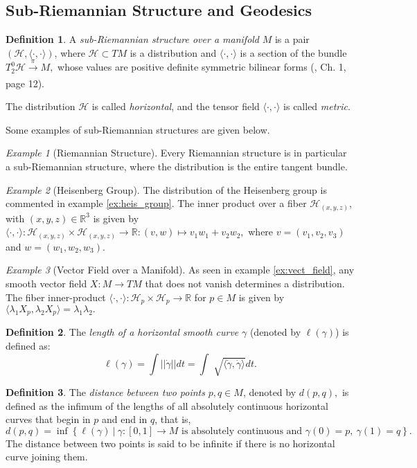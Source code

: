 \documentclass[12pt, letterpaper, reqno]{amsart}
\theoremstyle{definition}
\newtheorem{df}{Definition}
\theoremstyle{plain}
\theoremstyle{remark}
\newtheorem{ex}{Example}
\begin{document}
\subsection{Sub-Riemannian Structure and Geodesics}%
\label{sub:sub-Riemannian_structure_and_geodesics}
\begin{df}
	A \textit{sub-Riemannian structure over a manifold} $ M $ is a pair $ (\mathcal{H}, \langle\cdot,\cdot\rangle)$, where $ \mathcal{H}\subset TM $ is a distribution and $ \langle\cdot,\cdot\rangle $ is a section of the bundle $ T^0_2 \mathcal{H} \xrightarrow[]{\pi} M, $ whose values are positive definite symmetric bilinear forms (\cite{hatcher2003vector}, Ch. 1, page 12).

	The distribution $ \mathcal{H} $ is called \textit{horizontal}, and the tensor field $ \langle\cdot,\cdot\rangle $ is called \textit{metric}.  
\end{df}

Some examples of sub-Riemannian structures are given below.
\begin{ex}[Riemannian Structure]\label{ex:riem_geo2}
	Every Riemannian structure is in particular a sub-Riemannian structure, where the distribution is the entire tangent bundle.
\end{ex}

\begin{ex}[Heisenberg Group]\label{ex:heis_group2}
	The distribution of the Heisenberg group is commented in example \ref{ex:heis_group}. The inner product over a fiber $ \mathcal{H}_{(x,y,z)} $, with $ (x,y,z)\in \mathbb{R}^3 $  is given by $\langle\cdot,\cdot\rangle:  \mathcal{H}_{(x,y,z)}\times\mathcal{H}_{(x,y,z)} \rightarrow { \mathbb{R} }:(v,w)\mapsto v_1w_1+v_2w_2,$ where $ v=(v_1,v_2,v_3) $ and $ w=(w_1,w_2,w_3). $  

\end{ex}
\begin{ex}[Vector Field over a Manifold]\label{ex:vect_field2}
	As seen in example \ref{ex:vect_field}, any smooth vector field $ X: M \rightarrow TM$ that does not vanish determines a distribution.  The fiber inner-product $ \langle\cdot,\cdot\rangle: \mathcal{H}_p \times \mathcal{H}_p \rightarrow \mathbb{R} $ for $ p\in M $  is given by $\langle\lambda_1 X_p,\lambda_2 X_p\rangle=\lambda_1 \lambda_2.$
\end{ex}
\begin{df}
	The \textit{length of a horizontal smooth curve} $ \gamma $ (denoted by $ \ell(\gamma) $) is defined as:
$$ \ell(\gamma) = \int ||\dot{\gamma}|| dt= \int\sqrt[]{\langle\dot{\gamma}, \dot{\gamma}\rangle}dt. $$ 
\end{df}
\begin{df}\label{df:horizontal_distance}
	The \textit{distance between two points} $ p,q\in M $, denoted by $ d(p,q), $   is defined as the infimum of the lengths of all absolutely continuous horizontal curves that begin in $ p $ and end in $ q $, that is, 
$$ d(p,q) = \operatorname{inf} \left\{ \ell(\gamma) \ |\ \gamma:[0,1] \rightarrow {M} \text{ is absolutely continuous and }\gamma(0)=p, \ \gamma(1)=q \right\}. $$ 
The distance between two points is said to be infinite if there is no horizontal curve joining them.
\end{df}
\end{document}
